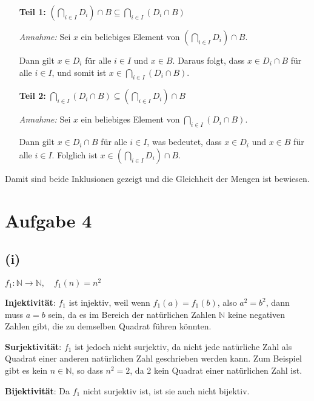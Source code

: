 \documentclass[12pt]{article}
\begin{document}
\begin{enumerate}
	\item[\textbf{Teil 1:}] \( \left(\bigcap_{i \in I} D_i\right) \cap B \subseteq \bigcap_{i \in I} (D_i \cap B) \)
	
		\textit{Annahme:} Sei \( x \) ein beliebiges Element von \( \left(\bigcap_{i \in I} D_i\right) \cap B \).
		
		Dann gilt \( x \in D_i \) für alle \( i \in I \) und \( x \in B \). Daraus folgt, dass \( x \in D_i \cap B \) für alle \( i \in I \), und somit ist \( x \in \bigcap_{i \in I} (D_i \cap B) \).
	
	\item[\textbf{Teil 2:}] \( \bigcap_{i \in I} (D_i \cap B) \subseteq \left(\bigcap_{i \in I} D_i\right) \cap B \)
	
		\textit{Annahme:} Sei \( x \) ein beliebiges Element von \( \bigcap_{i \in I} (D_i \cap B) \).
		
		Dann gilt \( x \in D_i \cap B \) für alle \( i \in I \), was bedeutet, dass \( x \in D_i \) und \( x \in B \) für alle \( i \in I \). Folglich ist \( x \in \left(\bigcap_{i \in I} D_i\right) \cap B \).
	
\end{enumerate}

Damit sind beide Inklusionen gezeigt und die Gleichheit der Mengen ist bewiesen.

\section*{Aufgabe 4}

\subsection*{(i)} \( f_1: \mathbb{N} \rightarrow \mathbb{N}, \quad f_1(n) = n^2 \)

\textbf{Injektivität}: \( f_1 \) ist injektiv, weil wenn \( f_1(a) = f_1(b) \), also \( a^2 = b^2 \), dann muss \( a = b \) sein, da es im Bereich der natürlichen Zahlen \(\mathbb{N}\) keine negativen Zahlen gibt, die zu demselben Quadrat führen könnten.

\textbf{Surjektivität}: \( f_1 \) ist jedoch nicht surjektiv, da nicht jede natürliche Zahl als Quadrat einer anderen natürlichen Zahl geschrieben werden kann. Zum Beispiel gibt es kein \( n \in \mathbb{N} \), so dass \( n^2 = 2 \), da 2 kein Quadrat einer natürlichen Zahl ist.

\textbf{Bijektivität}: Da \( f_1 \) nicht surjektiv ist, ist sie auch nicht bijektiv.
\end{document}
